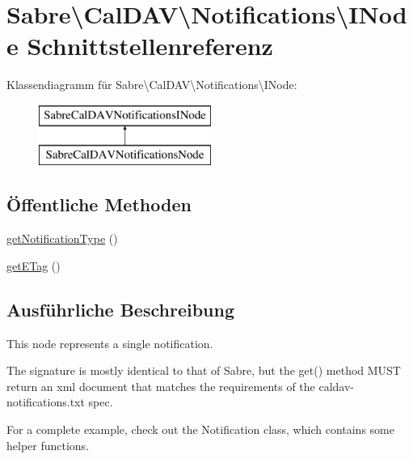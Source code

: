 \hypertarget{interface_sabre_1_1_cal_d_a_v_1_1_notifications_1_1_i_node}{}\section{Sabre\textbackslash{}Cal\+D\+AV\textbackslash{}Notifications\textbackslash{}I\+Node Schnittstellenreferenz}
\label{interface_sabre_1_1_cal_d_a_v_1_1_notifications_1_1_i_node}
Klassendiagramm für Sabre\textbackslash{}Cal\+D\+AV\textbackslash{}Notifications\textbackslash{}I\+Node\+:\begin{figure}[H]
\begin{center}
\leavevmode
\includegraphics[height=2.000000cm]{interface_sabre_1_1_cal_d_a_v_1_1_notifications_1_1_i_node}
\end{center}
\end{figure}
\subsection*{Öffentliche Methoden}
\begin{DoxyCompactItemize}
\item 
\mbox{\hyperlink{interface_sabre_1_1_cal_d_a_v_1_1_notifications_1_1_i_node_a0d1bdc2aa548290053019ed0f30c7dcf}{get\+Notification\+Type}} ()
\item 
\mbox{\hyperlink{interface_sabre_1_1_cal_d_a_v_1_1_notifications_1_1_i_node_a8c63b58470da3dd3c3f1088e3f6effc9}{get\+E\+Tag}} ()
\end{DoxyCompactItemize}


\subsection{Ausführliche Beschreibung}
This node represents a single notification.

The signature is mostly identical to that of Sabre, but the get() method M\+U\+ST return an xml document that matches the requirements of the \textquotesingle{}caldav-\/notifications.\+txt\textquotesingle{} spec.

For a complete example, check out the Notification class, which contains some helper functions.


